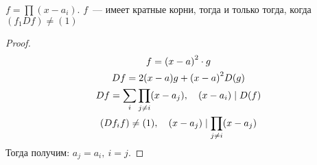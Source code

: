 \begin{theorem}
  $f = \prod (x - a_i)$. $f$~--- имеет кратные корни, тогда и только тогда, когда $(f_1 Df) \neq (1)$
\end{theorem}

\begin{proof}
  \begin{gather}
    f = {(x - a)}^2 \cdot g \\
    Df  = 2(x- a) g + {(x-  a)}^2 D(g) \\
    Df = \sum_{i} \prod_{j \neq i} (x - a_j), \quad (x - a_i) \mid D(f) \\
    (Df_i f) \neq (1), \quad (x - a_j) \mid \prod_{{j \neq i}} (x - a_j) \\
  \end{gather}
    Тогда получим: $a_j = a_i, \ i = j$.
\end{proof}
